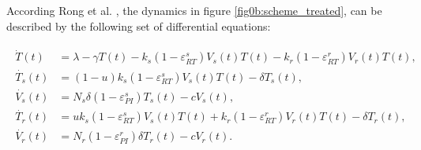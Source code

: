 
According Rong et al. \cite{rong2007emergence}, the dynamics in figure \ref{fig0b:scheme_treated}, can be described by the following set 
of differential equations:

\begin{align}
    \begin{split}
        \dot{T}(t) &= \lambda - \gamma T(t) - k_s (1 - \varepsilon_{RT}^s) V_s(t) T(t) - k_r (1 - \varepsilon_{RT}^r) V_r(t) T(t),\\
        \dot{T_s}(t) &= (1-u)k_s(1 - \varepsilon_{RT}^s)V_s(t)T(t) - \delta T_s(t),\\
        \dot{V_s}(t) &= N_s \delta (1 - \varepsilon_{PI}^s) T_s(t) - c V_s(t),\\
        \dot{T_r}(t) &= u k_s (1 - \varepsilon_{RT}^s) V_s(t) T(t) + k_r (1 - \varepsilon_{RT}^r) V_r(t) T(t) - \delta T_r(t),\\
        \dot{V_r}(t) &= N_r (1 - \varepsilon_{PI}^r) \delta T_r(t) - c V_r(t).
    \end{split}
    \label{equ:HIVmodel}
\end{align}

